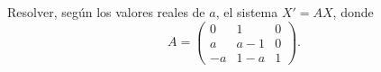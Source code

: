 Resolver, según los valores reales de \(a\), el sistema \(X'=AX\), donde
\[A=\begin{pmatrix}0&1&0\\a&a-1&0\\-a&1-a&1\end{pmatrix}.\]
